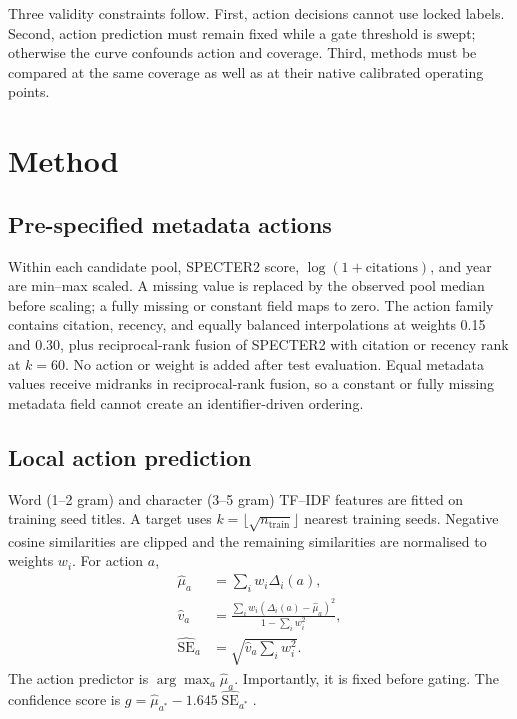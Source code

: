 \documentclass[11pt]{article}
\begin{document}
Three validity constraints follow.  First, action decisions cannot use locked labels.
Second, action prediction must remain fixed while a gate threshold is swept; otherwise
the curve confounds action and coverage.  Third, methods must be compared at the same
coverage as well as at their native calibrated operating points.

\section{Method}

\subsection{Pre-specified metadata actions}

Within each candidate pool, SPECTER2 score, \(\log(1+\text{citations})\), and year are
min--max scaled.  A missing value is replaced by the observed pool median before
scaling; a fully missing or constant field maps to zero.  The action family contains
citation, recency, and equally balanced interpolations at weights 0.15 and 0.30, plus
reciprocal-rank fusion of SPECTER2 with citation or recency rank at \(k=60\).  No
action or weight is added after test evaluation.  Equal metadata values receive
midranks in reciprocal-rank fusion, so a constant or fully missing metadata field
cannot create an identifier-driven ordering.

\subsection{Local action prediction}

Word (1--2 gram) and character (3--5 gram) TF--IDF features are fitted on training
seed titles.  A target uses \(k=\lfloor\sqrt{n_{\mathrm{train}}}\rfloor\) nearest
training seeds.  Negative cosine similarities are clipped and the remaining
similarities are normalised to weights \(w_i\).  For action \(a\),
\begin{align}
  \widehat\mu_a &= \sum_i w_i\Delta_i(a),\\
  \widehat v_a &= \frac{\sum_i w_i(\Delta_i(a)-\widehat\mu_a)^2}
    {1-\sum_i w_i^2},\\
  \widehat{\operatorname{SE}}_a &=
    \sqrt{\widehat v_a\sum_iw_i^2}.
\end{align}
The action predictor is \(\arg\max_a\widehat\mu_a\).  Importantly, it is fixed before
gating.  The confidence score is
\(g=\widehat\mu_{a^*}-1.645\widehat{\operatorname{SE}}_{a^*}\).
\end{document}
